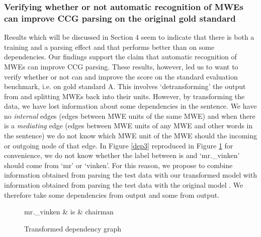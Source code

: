 \documentclass[output=paper]{LSP/langsci}
\begin{document}
    \subsubsection{Verifying whether or not automatic recognition of MWEs can improve CCG parsing on the original gold standard}
    \label{evalA}
    \indent Results which will be discussed in Section 4 seem to indicate that there is both a training and a parsing effect and that \modelB performs better than \modelA on some dependencies. Our findings support the claim that automatic recognition of MWEs can improve CCG parsing. These results, however, led us to want to verify whether or not \modelB can and improve the score on the standard evaluation benchmark, i.e. on gold standard A. This involves `detransforming' the output from \modelB and splitting MWEs back into their units. However, by transforming the data, we have lost information about some dependencies in the sentence. We have no \textit{internal} edges (edges between MWE units of the same MWE) and when there is a \textit{mediating} edge (edges between MWE units of any MWE and other words in the sentence) we do not know which MWE unit of the MWE should the incoming or outgoing node of that edge. In Figure \ref{dep3} reproduced in Figure \ref{dep5} for convenience, we do not know whether the label between is and `mr.\_vinken' should come from `mr' or `vinken'. For this reason, we propose to combine information obtained from parsing the test data with our transformed model \modelB with information obtained from parsing the test data with the original model \modelA. We therefore take some dependencies from output and some from output.

    \begin{figure}[H]
        \center
        \begin{dependency}
            \begin{deptext}[column sep=1em]
                mr.\_vinken \& is \& chairman \\
            \end{deptext}
        \end{dependency}
        \caption{Transformed dependency graph\label{dep5}}
    \end{figure}
\end{document}
